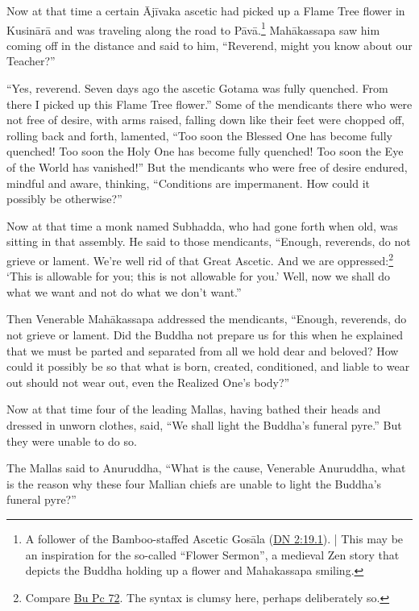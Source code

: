 \documentclass[12pt,openany]{book}%
\begin{document}
Now at that time a certain \textsanskrit{Ājīvaka} ascetic had picked up a Flame Tree flower in \textsanskrit{Kusinārā} and was traveling along the road to \textsanskrit{Pāvā}.\footnote{A follower of the Bamboo-staffed Ascetic \textsanskrit{Gosāla} (\href{https://suttacentral.net/dn2/en/sujato\#19.1}{DN 2:19.1}). | This may be an inspiration for the so-called “Flower Sermon”, a medieval Zen story that depicts the Buddha holding up a flower and Mahakassapa smiling. } \textsanskrit{Mahākassapa} saw him coming off in the distance and said to him, “Reverend, might you know about our Teacher?” 

“Yes, reverend. Seven days ago the ascetic Gotama was fully quenched. From there I picked up this Flame Tree flower.” Some of the mendicants there who were not free of desire, with arms raised, falling down like their feet were chopped off, rolling back and forth, lamented, “Too soon the Blessed One has become fully quenched! Too soon the Holy One has become fully quenched! Too soon the Eye of the World has vanished!” But the mendicants who were free of desire endured, mindful and aware, thinking, “Conditions are impermanent. How could it possibly be otherwise?” 

Now at that time a monk named Subhadda, who had gone forth when old, was sitting in that assembly. He said to those mendicants, “Enough, reverends, do not grieve or lament. We’re well rid of that Great Ascetic. And we are oppressed:\footnote{Compare \href{https://suttacentral.net/pli-tv-bu-vb-pc72/en/sujato}{Bu Pc 72}. The syntax is clumsy here, perhaps deliberately so. } ‘This is allowable for you; this is not allowable for you.’ Well, now we shall do what we want and not do what we don’t want.” 

Then Venerable \textsanskrit{Mahākassapa} addressed the mendicants, “Enough, reverends, do not grieve or lament. Did the Buddha not prepare us for this when he explained that we must be parted and separated from all we hold dear and beloved? How could it possibly be so that what is born, created, conditioned, and liable to wear out should not wear out, even the Realized One’s body?” 

Now at that time four of the leading Mallas, having bathed their heads and dressed in unworn clothes, said, “We shall light the Buddha’s funeral pyre.” But they were unable to do so. 

The Mallas said to Anuruddha, “What is the cause, Venerable Anuruddha, what is the reason why these four Mallian chiefs are unable to light the Buddha’s funeral pyre?” 
\end{document}
